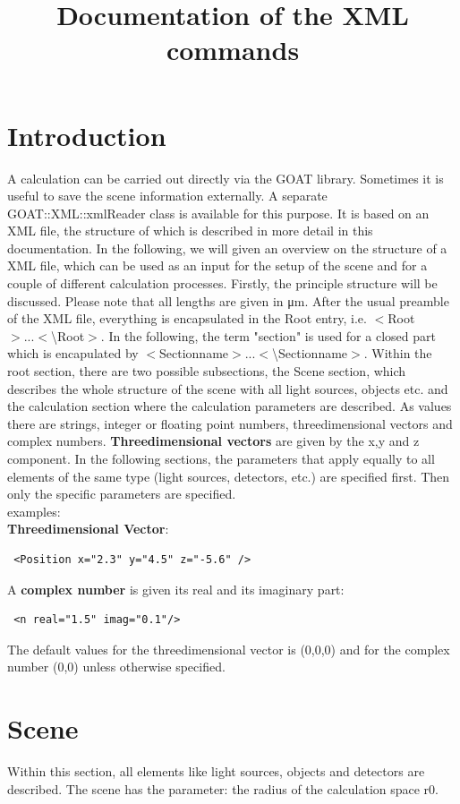\documentclass[a4paper,html,11pt,openany]{book}
\begin{document}
  \title{Documentation of the XML commands}
  \tableofcontents   
  \chapter{Introduction}
A calculation can be carried out directly via the GOAT library. Sometimes it is useful to save the scene information externally. A separate GOAT::XML::xmlReader class is available for this purpose. It is based on an XML file, the structure of which is described in more detail in this documentation. 
  In the following, we will given an overview on the structure of a XML file, which can be used as an input for the setup of the scene and for a couple of different calculation processes. Firstly, the principle structure will be discussed. Please note that all lengths are given in \si{\micro\metre}. After the usual preamble of the XML file, everything is encapsulated in the Root entry, i.e. $<$Root$>...<$\textbackslash Root$>$.   
   In the following, the term "section" is used for a closed part which is encapulated by $<$Sectionname$>...<$\textbackslash Sectionname$>$. Within the root section, there are two possible subsections, the Scene section, which describes the whole structure of the scene with all light sources, objects etc. and the calculation section where the calculation parameters are described. As values there are strings, integer or floating point numbers, threedimensional vectors and complex numbers. \textbf{Threedimensional vectors} are given by the x,y and z component. In the following sections, the parameters that apply equally to all elements of the same type (light sources, detectors, etc.) are specified first. Then only the specific parameters are specified.  \\
   examples: \\   

 \textbf{Threedimensional Vector}:   
    \lstset{language=XML}
 \begin{lstlisting}
 <Position x="2.3" y="4.5" z="-5.6" />
   \end{lstlisting}
   A \textbf{complex number} is given its real and its imaginary part: 
 \begin{lstlisting}
 <n real="1.5" imag="0.1"/>
   \end{lstlisting}
  The default values for the threedimensional vector is (0,0,0) and for the complex number (0,0) unless otherwise specified. 
 \chapter{Scene}
 Within this section, all elements like light sources, objects and detectors are described. The scene has the parameter: the radius of the calculation space r0.
   
\end{document}
